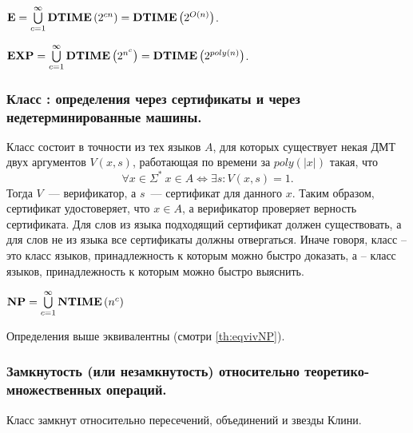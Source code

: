 \begin{definition} 
$\textbf{E} = \bigcup\limits_{c = 1}^\infty \textbf{DTIME}\left({2^{cn}}\right) = \textbf{DTIME}\left({2^{O(n)}}\right)$.
\end{definition}

\begin{definition} 
$\textbf{EXP} = \bigcup\limits_{c = 1}^\infty \textbf{DTIME}\left({2^{n^c}}\right) = \textbf{DTIME}\left({2^{poly(n)}}\right)$.
\end{definition}

\subsubsection{Класс \np : определения через сертификаты и через недетерминированные машины.}
\begin{definition} Класс \np состоит в точности из тех языков $A$, для которых существует некая ДМТ двух аргументов $V(x, s)$, работающая по времени за $poly(|x|)$ такая, что
$$
\forall x \in \Sigma^* \ x \in A \Longleftrightarrow \exists s: V(x, s) = 1.
$$
Тогда $V$~--- верификатор, а $s$~--- сертификат для данного $x$.  Таким образом, сертификат удостоверяет, что $x \in A$, а верификатор проверяет верность сертификата. Для слов из языка подходящий сертификат
должен существовать, а для слов не из языка все сертификаты должны отвергаться. Иначе говоря, класс \np -- это класс языков, принадлежность к которым можно быстро доказать, а \p -- класс языков, принадлежность к которым можно быстро выяснить.
\end{definition}

\begin{definition} $\textbf{NP} = \bigcup\limits_{c=1}^{\infty}\textbf{NTIME}\left({n^c}\right)$
\end{definition}

\begin{note} Определения выше эквивалентны (смотри \ref{th:eqvivNP}).
\end{note} 

\subsubsection{Замкнутость (или незамкнутость) \np относительно теоретико-множественных
операций.}

\begin{statement}
Класс \np замкнут относительно пересечений, объединений и звезды Клини.
\end{statement}

